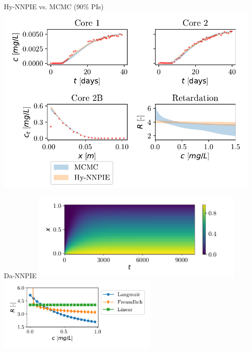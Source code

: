 \documentclass[aspectratio=1610]{beamer}
\begin{document}
\begin{frame}{Hy-NNPIE vs. MCMC (90\% PIs)}
\centering
\includegraphics[height=0.9\textheight]{figs/finn_MCMCvsSPAN_PIs.pdf}
\end{frame}

\begin{frame}{Da-NNPIE}
\centering
\includegraphics[width=0.8\textwidth]{figs/c_diss_field_full.pdf}
\pause
\includegraphics[width=0.6\textwidth]{figs/parametric_isotherms.pdf}
\end{frame}
\end{document}
